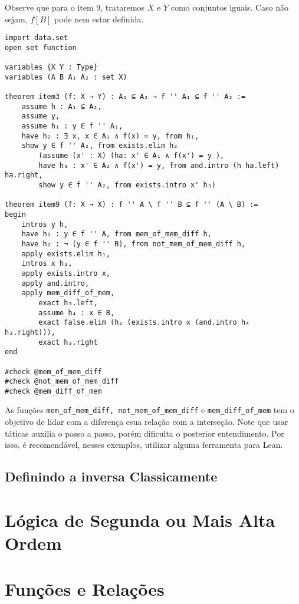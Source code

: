 Observe que para o item 9, trataremos $X$ e $Y$ como conjuntos iguais. Caso não sejam,
$f[B]$ pode nem estar definida.

\begin{lstlisting}
import data.set
open set function

variables {X Y : Type}
variables (A B A₁ A₂ : set X)

theorem item3 (f: X → Y) : A₁ ⊆ A₂ → f '' A₁ ⊆ f '' A₂ :=
    assume h : A₁ ⊆ A₂,
    assume y,
    assume h₁ : y ∈ f '' A₁,
    have h₂ : ∃ x, x ∈ A₁ ∧ f(x) = y, from h₁,
    show y ∈ f '' A₂, from exists.elim h₂
        (assume (x' : X) (ha: x' ∈ A₁ ∧ f(x') = y ),
        have h₃ : x' ∈ A₂ ∧ f(x') = y, from and.intro (h ha.left)  ha.right,
        show y ∈ f '' A₂, from exists.intro x' h₃)

theorem item9 (f: X → X) : f '' A \ f '' B ⊆ f '' (A \ B) :=
begin
    intros y h,
    have h₁ : y ∈ f '' A, from mem_of_mem_diff h,
    have h₂ : ¬ (y ∈ f '' B), from not_mem_of_mem_diff h,
    apply exists.elim h₁,
    intros x h₃,
    apply exists.intro x,
    apply and.intro,
    apply mem_diff_of_mem,
        exact h₃.left,
        assume h₄ : x ∈ B,
        exact false.elim (h₂ (exists.intro x (and.intro h₄ h₃.right))),
        exact h₃.right
end

#check @mem_of_mem_diff
#check @not_mem_of_mem_diff
#check @mem_diff_of_mem

\end{lstlisting}

As funções \lstinline{mem_of_mem_diff, not_mem_of_mem_diff} e \lstinline{mem_diff_of_mem}
tem o objetivo de lidar com a diferença esua relação com a interseção. Note que usar táticas
auxilia o passo a passo, porém dificulta o posterior entendimento. Por isso, é recomendável,
nesses exemplos, utilizar alguma ferramenta para Lean.

\subsection{Definindo a inversa Classicamente}

\section{Lógica de Segunda ou Mais Alta Ordem}

\section{Funções e Relações}
